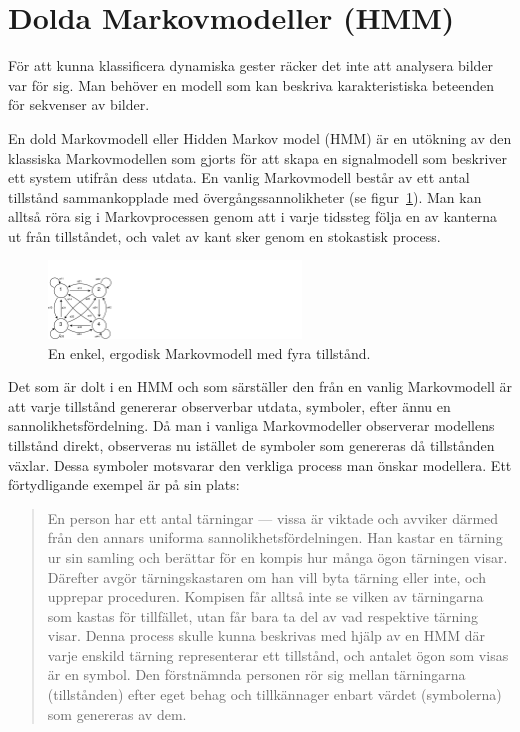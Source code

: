\documentclass[../rapport_MVEX01-11-05]{subfiles}
\begin{document}
\section{Dolda Markovmodeller (HMM)}\label{sec:HMM}
För att kunna klassificera dynamiska gester räcker det inte att 
analysera bilder var för sig. Man behöver en modell som kan beskriva
karakteristiska beteenden för sekvenser av bilder.

En dold Markovmodell eller Hidden Markov model (HMM) är en utökning
av den klassiska Markovmodellen som gjorts för att skapa en
signalmodell som beskriver ett system utifrån dess utdata.
En vanlig Markovmodell består av ett antal tillstånd sammankopplade
med övergångssannolikheter (se figur~\ref{fig:hmm-ergodic}). Man kan alltså
röra sig i Markovprocessen genom att i varje tidssteg följa en av kanterna
ut från tillståndet, och valet av kant sker genom en stokastisk process.

\begin{figure}[tb]
  \centering
  \includegraphics[width=0.6\textwidth,trim=0 0 935 80,clip=true]{bilder/ergodicHMM}
  \caption{En enkel, ergodisk Markovmodell med fyra tillstånd.}
  \label{fig:hmm-ergodic}
\end{figure}

Det som är dolt i en HMM och som särställer den från en vanlig Markovmodell
är att varje tillstånd genererar observerbar utdata, symboler, efter ännu en sannolikhetsfördelning. Då man i vanliga Markovmodeller
observerar modellens tillstånd direkt, observeras nu istället de
symboler som genereras då tillstånden växlar. Dessa symboler motsvarar
den verkliga process man önskar modellera. Ett förtydligande exempel
är på sin plats: 

\begin{quote}
En person har ett antal tärningar --- vissa är viktade och avviker därmed
från den annars uniforma sannolikhetsfördelningen.
Han kastar en tärning ur sin
samling och berättar för en kompis hur många ögon tärningen
visar. Därefter avgör tärningskastaren om han vill byta tärning eller
inte, och upprepar proceduren. Kompisen får alltså inte se vilken av
tärningarna som kastas för tillfället, utan får bara ta del av vad
respektive tärning visar. Denna process skulle kunna beskrivas med
hjälp av en HMM där varje enskild tärning representerar ett
tillstånd, och antalet ögon som visas är en symbol.
Den förstnämnda personen rör sig mellan tärningarna
(tillstånden) efter eget behag och tillkännager enbart värdet
(symbolerna) som genereras av dem. 
\end{quote}
\end{document}
